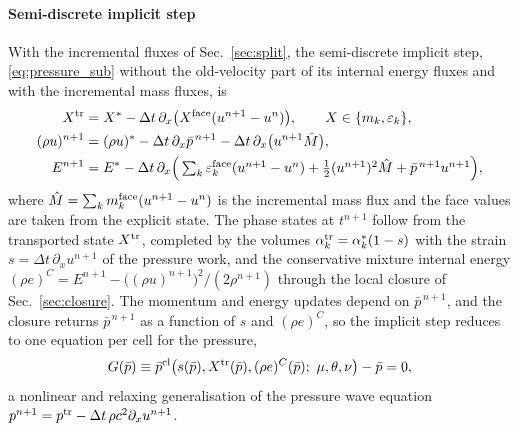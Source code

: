 \documentclass[a4paper,fleqn]{cas-sc}
\begin{document}
\paragraph{Semi-discrete implicit step}
With the incremental fluxes of Sec.~\ref{sec:split}, the semi-discrete implicit step, \eqref{eq:pressure_sub} without the old-velocity part of
its internal energy fluxes and with the incremental mass fluxes, is
\begin{equation}
\begin{aligned}
X^{\rm tr}&=X^*-\Delta t\,\partial_x\big(X^{\rm face}(u^{n+1}-u^n)\big),\qquad X\in\{m_k,\varepsilon_k\},\\
(\rho u)^{n+1}&=(\rho u)^*-\Delta t\,\partial_x\bar p^{\,n+1}-\Delta t\,\partial_x\big(u^{n+1}\hat M\big),\\
E^{n+1}&=E^*-\Delta t\,\partial_x\Big(\textstyle\sum_k\varepsilon^{\rm face}_k(u^{n+1}-u^n)+\tfrac12(u^{n+1})^2\hat M+\bar p^{\,n+1}u^{n+1}\Big),
\end{aligned}
\label{eq:semidiscrete}
\end{equation}
where $\hat M=\sum_km^{\rm face}_k(u^{n+1}-u^n)$ is the incremental mass flux and the face values are taken from the explicit
state. The phase states at $t^{n+1}$ follow from the transported state $X^{\rm tr}$, completed by the volumes
$\alpha^{\rm tr}_k=\alpha^*_k(1-s)$ with the strain $s=\Delta t\,\partial_xu^{n+1}$ of the pressure work, and the conservative mixture internal energy
$(\rho e)^C=E^{n+1}-\big((\rho u)^{n+1}\big)^2/(2\rho^{n+1})$ through the local closure of Sec.~\ref{sec:closure}. The momentum and energy updates depend on $\bar p^{\,n+1}$, and the closure returns $\bar p^{\,n+1}$ as a function of
$s$ and $(\rho e)^C$, so the implicit step reduces to one equation per cell for the pressure,
\begin{equation}
G(\bar p)\equiv\bar p^{\rm cl}\big(s(\bar p),X^{\rm tr}(\bar p),(\rho e)^C(\bar p);\ \mu,\theta,\nu\big)-\bar p=0 ,
\label{eq:global_semi}
\end{equation}
a nonlinear and relaxing generalisation of the pressure wave equation $p^{n+1}=p^{\rm tr}-\Delta t\,\rho c^2\partial_xu^{n+1}$.
\end{document}
